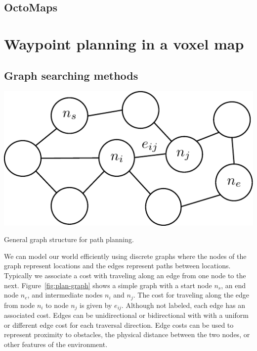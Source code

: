 
\subsection{OctoMaps}



\section{Waypoint planning in a voxel map}

\subsection{Graph searching methods}
%
\begin{marginfigure}
  \includegraphics[width=\linewidth]{chap5_trajectory_planning/figures/plan-graph}
  \caption{General graph structure for path planning.}
  \label{fig:plan-graph}  
\end{marginfigure}
%
We can model our world efficiently using discrete graphs where the nodes of the graph represent locations and the edges represent paths between locations. Typically we associate a cost with traveling along an edge from one node to the next. Figure~\ref{fig:plan-graph} shows a simple graph with a start node $n_s$, an end node $n_e$, and intermediate nodes $n_i$ and $n_j$. The cost for traveling along the edge from node $n_i$ to node $n_j$ is given by $e_{ij}$. Although not labeled, each edge has an associated cost. Edges can be unidirectional or bidirectional with with a uniform or different edge cost for each traversal direction. Edge costs can be used to represent proximity to obstacles, the physical distance between the two nodes, or other features of the environment. 

